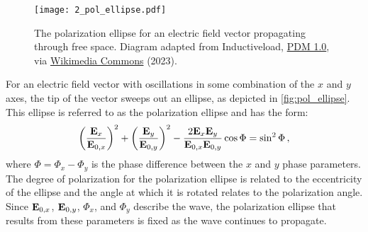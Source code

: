 \begin{figure}[t]
    \centering
    \texttt{[image: 2\_pol\_ellipse.pdf]}
    \caption{The polarization ellipse for an electric field vector propagating through free space. Diagram adapted from Inductiveload, \protect\href{https://creativecommons.org/publicdomain/mark/1.0/}{PDM 1.0}, via \protect\href{https://commons.wikimedia.org/wiki/File:Polarisation_ellipse2.svg}{Wikimedia Commons} (2023).}
    \label{fig:pol_ellipse}
\end{figure}

For an electric field vector with oscillations in some combination of the $x$ and $y$ axes, the tip of the vector sweeps out an ellipse, as depicted in \autoref{fig:pol_ellipse}. This ellipse is referred to as the polarization ellipse and has the form:
\begin{equation} \label{eq:pol_ellipse}
    \left( \frac{\mathbf{E}_{x}}{\mathbf{E}_{0, x}}\right)^{2} +
    \left( \frac{\mathbf{E}_{y}}{\mathbf{E}_{0, y}}\right)^{2} -
    \frac{2 \mathbf{E}_{x} \mathbf{E}_{y}}{\mathbf{E}_{0, x} \mathbf{E}_{0, y}} \cos\Phi =
    \sin^{2} \Phi\,,
\end{equation}
where $\Phi = \Phi_{x} - \Phi_{y}$ is the phase difference between the $x$ and $y$ phase parameters. The degree of polarization for the polarization ellipse is related to the eccentricity of the ellipse and the angle at which it is rotated relates to the polarization angle. Since $\mathbf{E}_{0, x}$, $\mathbf{E}_{0, y}$, $\Phi_{x}$, and $\Phi_{y}$ describe the wave, the polarization ellipse that results from these parameters is fixed as the wave continues to propagate.

